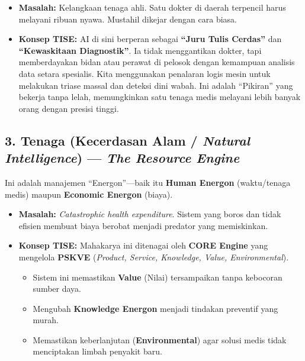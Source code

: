 \documentclass[
  letterpaper,
  DIV=11,
  numbers=noendperiod]{scrreprt}
\providecommand{\tightlist}{%
  \setlength{\itemsep}{0pt}\setlength{\parskip}{0pt}}
\begin{document}
\begin{itemize}
\tightlist
\item
  \textbf{Masalah:} Kelangkaan tenaga ahli. Satu dokter di daerah
  terpencil harus melayani ribuan nyawa. Mustahil dikejar dengan cara
  biasa.
\item
  \textbf{Konsep TISE:} AI di sini berperan sebagai \textbf{``Juru Tulis
  Cerdas''} dan \textbf{``Kewaskitaan Diagnostik''}. Ia tidak
  menggantikan dokter, tapi memberdayakan bidan atau perawat di pelosok
  dengan kemampuan analisis data setara spesialis. Kita menggunakan
  penalaran logis mesin untuk melakukan triase massal dan deteksi dini
  wabah. Ini adalah ``Pikiran'' yang bekerja tanpa lelah, memungkinkan
  satu tenaga medis melayani lebih banyak orang dengan presisi tinggi.
\end{itemize}

\subsection{\texorpdfstring{3. Tenaga (Kecerdasan Alam / \emph{Natural
Intelligence}) --- \emph{The Resource
Engine}}{3. Tenaga (Kecerdasan Alam / Natural Intelligence) --- The Resource Engine}}\label{tenaga-kecerdasan-alam-natural-intelligence-the-resource-engine}

Ini adalah manajemen ``Energon''---baik itu \textbf{Human Energon}
(waktu/tenaga medis) maupun \textbf{Economic Energon} (biaya).

\begin{itemize}
\tightlist
\item
  \textbf{Masalah:} \emph{Catastrophic health expenditure}. Sistem yang
  boros dan tidak efisien membuat biaya berobat menjadi predator yang
  memiskinkan.
\item
  \textbf{Konsep TISE:} Mahakarya ini ditenagai oleh \textbf{CORE
  Engine} yang mengelola \textbf{PSKVE} (\emph{Product, Service,
  Knowledge, Value, Environmental}).

  \begin{itemize}
  \tightlist
  \item
    Sistem ini memastikan \textbf{Value} (Nilai) tersampaikan tanpa
    kebocoran sumber daya.
  \item
    Mengubah \textbf{Knowledge Energon} menjadi tindakan preventif yang
    murah.
  \item
    Memastikan keberlanjutan (\textbf{Environmental}) agar solusi medis
    tidak menciptakan limbah penyakit baru.
  \end{itemize}
\end{itemize}
\end{document}
